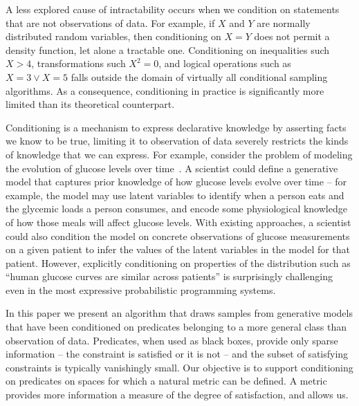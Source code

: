 A less explored cause of intractability occurs when we condition on statements that are not observations of data.
For example, if $X$ and $Y$ are normally distributed random variables, then conditioning on $X = Y$ does not permit a density function, let alone a tractable one.
Conditioning on inequalities such $X > 4$, transformations such $X^2  = 0$, and logical operations such as  $X = 3 \lor X = 5$ falls outside the domain of virtually all conditional sampling algorithms.
As a consequence, conditioning in practice is significantly more limited than its theoretical counterpart.


Conditioning is a mechanism to express declarative knowledge by asserting facts we know to be true, limiting it to observation of data severely restricts the kinds of knowledge that we can express.
For example, consider the problem of modeling the evolution of glucose levels over time~\citep{levine2017offline}.
A scientist could define a generative model that captures prior knowledge of how glucose levels evolve over time -- for example, the model may use latent variables to identify when a person eats and the glycemic loads a person consumes, and encode some physiological knowledge of how those meals will affect glucose levels.
With existing approaches, a scientist could also condition the model on concrete observations of glucose measurements on a given patient to infer the values of the latent variables in the model for that patient.
However, explicitly conditioning on properties of the distribution such as ``human glucose curves are similar across patients'' is surprisingly challenging even in the most expressive probabilistic programming systems. 



In this paper we present an algorithm that draws samples from generative models that have been conditioned on predicates belonging to a more general class than observation of data.
Predicates, when used as black boxes, provide only sparse information -- the constraint is satisfied or it is not -- and the subset of satisfying constraints is typically vanishingly small.
Our objective is to support conditioning on predicates on spaces for which a natural metric can be defined.
A metric provides more information a measure of the degree of satisfaction, and allows us.

